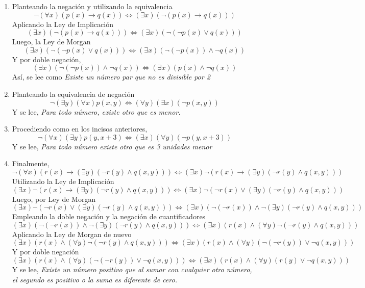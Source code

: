 \begin{enumerate}
	\item Planteando la negaci\'on y utilizando la equivalencia
	\begin{equation*}
		\neg(\forall x)(p(x) \rightarrow q(x)) \Leftrightarrow (\exists x)(\neg(p(x) \rightarrow q(x)))
	\end{equation*}
	Aplicando la Ley de Implicaci\'on $$(\exists x)(\neg(p(x) \rightarrow q(x))) \Leftrightarrow (\exists x)(\neg(\neg p(x) \vee q(x)))$$ 
	Luego, la Ley de Morgan $$(\exists x)(\neg(\neg p(x) \vee q(x))) \Leftrightarrow (\exists x)(\neg (\neg p(x)) \wedge \neg q(x))$$ 
	Y por doble negaci\'on, $$(\exists x)(\neg (\neg p(x)) \wedge \neg q(x)) \Leftrightarrow (\exists x)(p(x) \wedge \neg q(x))$$ 
	As\'i, se lee como \textit{Existe un n\'umero par que no es divisible por 2}
	
	\item Planteando la equivalencia de negaci\'on $$\neg (\exists y)(\forall x)p(x,y) \Leftrightarrow (\forall y)(\exists x)(\neg p(x,y))$$ Y se lee, \textit{Para todo n\'umero, existe otro que es menor.}
	
	\item Procediendo como en los incisos anteriores, $$\neg (\forall x)(\exists y) p(y, x+3) \Leftrightarrow (\exists x)(\forall y)(\neg p(y, x+3))$$ Y se lee, \textit{Para todo n\'umero existe otro que es 3 unidades menor}
	
	\item Finalmente, $$\neg (\forall x)(r(x) \rightarrow (\exists y)(\neg r(y) \wedge q(x,y))) \Leftrightarrow (\exists x)\neg(r(x) \rightarrow (\exists y)(\neg r(y) \wedge q(x,y)))$$
	Utilizando la Ley de Implicaci\'on $$(\exists x)\neg(r(x) \rightarrow (\exists y)(\neg r(y) \wedge q(x,y))) \Leftrightarrow (\exists x)\neg(\neg r(x) \vee (\exists y)(\neg r(y) \wedge q(x,y)))$$
	Luego, por Ley de Morgan $$(\exists x)\neg(\neg r(x) \vee (\exists y)(\neg r(y) \wedge q(x,y))) \Leftrightarrow (\exists x)(\neg (\neg r(x)) \wedge \neg (\exists y)(\neg r(y) \wedge q(x,y)))$$
	Empleando la doble negaci\'on y la negaci\'on de cuantificadores $$(\exists x)(\neg (\neg r(x)) \wedge \neg (\exists y)(\neg r(y) \wedge q(x,y))) \Leftrightarrow (\exists x)(r(x) \wedge (\forall y)\neg(\neg r(y) \wedge q(x,y)))$$
	Aplicando la Ley de Morgan de nuevo $$(\exists x)(r(x) \wedge (\forall y)\neg(\neg r(y) \wedge q(x,y))) \Leftrightarrow (\exists x)(r(x) \wedge (\forall y)(\neg (\neg r(y)) \vee \neg q(x,y)))$$
	Y por doble negaci\'on $$(\exists x)(r(x) \wedge (\forall y)(\neg (\neg r(y)) \vee \neg q(x,y))) \Leftrightarrow (\exists x)(r(x) \wedge (\forall y)(r(y) \vee \neg q(x,y)))$$ 
	Y se lee, \textit{Existe un n\'umero positivo que al sumar con cualquier otro n\'umero, el segundo es positivo o la suma es diferente de cero.}
\end{enumerate}


